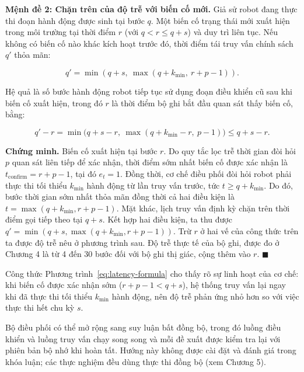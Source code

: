 \textbf{Mệnh đề 2: Chặn trên của độ trễ với biến cố mới.} Giả sử robot đang thực thi đoạn hành động được sinh tại bước $q$. Một biến cố trạng thái mới xuất hiện trong môi trường tại thời điểm $r$ (với $q < r \le q + s$) và duy trì liên tục. Nếu không có biến cố nào khác kích hoạt trước đó, thời điểm tái truy vấn chính sách $q'$ thỏa mãn:

\begin{equation}
q' = \min(q + s,\ \max(q + k_{\min},\ r + p - 1)).
\label{eq:latency-formula}
\end{equation}

Hệ quả là số bước hành động robot tiếp tục sử dụng đoạn điều khiển cũ sau khi biến cố xuất hiện, trong đó $r$ là thời điểm bộ ghi bắt đầu quan sát thấy biến cố, bằng:

\begin{equation}
q' - r = \min\!\big(q + s - r,\ \max(q + k_{\min} - r,\ p - 1)\big) \le q + s - r.
\label{eq:latency-bound}
\end{equation}

\textbf{Chứng minh.} Biến cố xuất hiện tại bước $r$. Do quy tắc lọc trễ thời gian đòi hỏi $p$ quan sát liên tiếp để xác nhận, thời điểm sớm nhất biến cố được xác nhận là $t_{\mathrm{confirm}} = r + p - 1$, tại đó $e_t = 1$. Đồng thời, cơ chế điều phối đòi hỏi robot phải thực thi tối thiểu $k_{\min}$ hành động từ lần truy vấn trước, tức $t \ge q + k_{\min}$. Do đó, bước thời gian sớm nhất thỏa mãn đồng thời cả hai điều kiện là $t = \max(q + k_{\min}, r + p - 1)$. Mặt khác, lịch truy vấn định kỳ chặn trên thời điểm gọi tiếp theo tại $q + s$. Kết hợp hai điều kiện, ta thu được $q' = \min(q + s, \max(q + k_{\min}, r + p - 1))$. Trừ $r$ ở hai vế của công thức trên ta được độ trễ nêu ở phương trình sau. Độ trễ thực tế của bộ ghi, được đo ở Chương 4 là từ 4 đến 30 bước đối với bộ ghi thị giác, cộng thêm vào $r$. $\blacksquare$

Công thức Phương trình~\eqref{eq:latency-formula} cho thấy rõ sự linh hoạt của cơ chế: khi biến cố được xác nhận sớm ($r + p - 1 < q + s$), hệ thống truy vấn lại ngay khi đã thực thi tối thiểu $k_{\min}$ hành động, nên độ trễ phản ứng nhỏ hơn so với việc thực thi hết chu kỳ $s$.

Bộ điều phối có thể mở rộng sang suy luận bất đồng bộ, trong đó luồng điều khiển và luồng truy vấn chạy song song và mỗi đề xuất được kiểm tra lại với phiên bản bộ nhớ khi hoàn tất. Hướng này không được cài đặt và đánh giá trong khóa luận; các thực nghiệm đều dùng thực thi đồng bộ (xem Chương 5).

